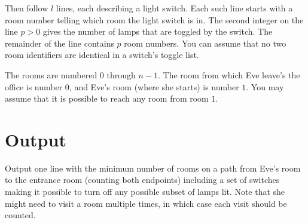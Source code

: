 Then follow $l$ lines, each describing a light switch. Each such line
starts with a room number telling which room the light switch is
in. The second integer on the line $p>0$ gives the number of lamps
that are toggled by the switch. The remainder of the line contains $p$
room numbers. You can assume that no two room identifiers are
identical in a switch's toggle list.

The rooms are numbered $0$ through $n-1$. The room
from which Eve leave's the office is number $0$, and Eve's room (where
she starts) is number $1$.  You may assume that it is possible to reach any room from room $1$.

\section*{Output}

Output one line with the minimum number of rooms on a path from Eve's room to the entrance room (counting both endpoints) including a set of switches making it possible to turn off any possible subset of lamps lit. Note that she might need to visit a room multiple times, in which case each visit should be counted.

